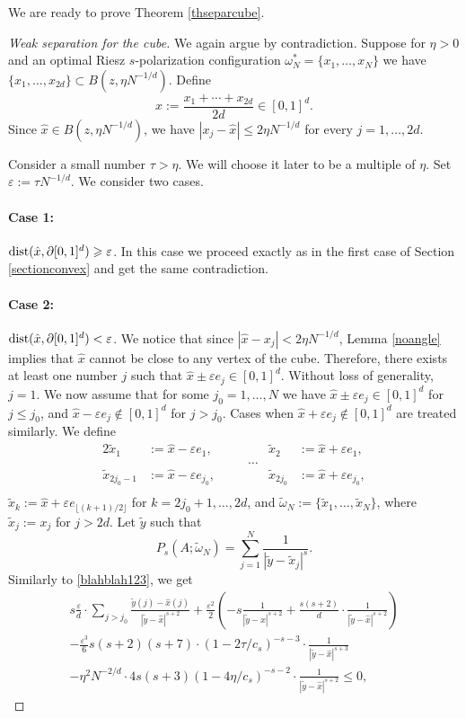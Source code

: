 \documentclass[12pt]{amsart}
\theoremstyle{definition}
\def\sli{\sum\limits}
\def\ep{\varepsilon}
\newcommand{\1}{\mathbf{1}}
\begin{document}
We are ready to prove Theorem \ref{thseparcube}.
\begin{proof}[Weak separation for the cube]
We again argue by contradiction. Suppose for $\eta>0$ and an optimal Riesz $s$-polarization configuration $\omega^*_N=\{x_1, \ldots, x_N\}$ we have $\{x_1, \ldots, x_{2d}\}\subset B(z, \eta N^{-1/d})$. Define
$$
\hat{x}:=\frac{x_1+\cdots+x_{2d}}{2d}\in [0,1]^d.
$$
Since $\hat{x}\in B(z, \eta N^{-1/d})$, we have $|x_j-\hat{x}|\leqslant 2\eta N^{-1/d}$ for every $j=1,\ldots, 2d$. 

Consider a small number $\tau>\eta$. We will choose it later to be a multiple of $\eta$. Set $\ep:=\tau N^{-1/d}$. We consider two cases.
\paragraph{\textbf{Case 1:}} $\textup{dist}(\hat{x}, \partial [0,1]^d)\geqslant \ep$.
In this case we proceed exactly as in the first case of Section \ref{sectionconvex} and get the same contradiction.

\bigskip

\paragraph{\textbf{Case 2:}}$\textup{dist}(\hat{x}, \partial [0,1]^d)<\ep$. We notice that since $|\hat{x}-x_j|<2\eta N^{-1/d}$, Lemma \ref{noangle} implies that $\hat{x}$ cannot be close to any vertex of the cube. Therefore, there exists at least one number $j$ such that $\hat{x}\pm \ep e_j \in [0,1]^d$. Without loss of generality, $j=1$. We now assume that for some $j_0=1,\ldots, N$ we have $\hat{x}\pm \ep e_j \in [0,1]^d$ for $j\leqslant j_0$, and $\hat{x}-\ep e_j \not\in [0,1]^d$ for $j>j_0$. Cases when $\hat{x}+\ep e_j\not\in [0,1]^d$ are treated similarly.
We define
\begin{alignat*}{2}
\tilde{x}_1&:=\hat{x}-\ep e_1,  & \tilde{x}_2&:=\hat{x}+\ep e_1,\\
& \qquad\qquad\qquad\qquad\ldots & \\ 
\tilde{x}_{2j_0-1}&:=\hat{x}-\ep e_{j_0}, & \tilde{x}_{2j_0}&:=\hat{x}+\ep e_{j_0},\\
\end{alignat*}
$\tilde{x}_{k}:=\hat{x}+\ep e_{\lfloor (k+1)/2 \rfloor}$ for $k=2j_0+1,\ldots, 2d$, and $\widetilde{\omega}_N:=\{\tilde{x}_1, \ldots, \tilde{x}_N\}$, where $\tilde{x}_j:=x_j$ for $j>2d$. Let $\tilde{y}$ such that 
$$
P_s(A; \widetilde\omega_N)=\sli_{j=1}^N\frac{1}{|\tilde{y}-\tilde{x}_j|^s}.
$$
Similarly to \eqref{blahblah123}, we get
\begin{multline}\label{blahblah321}
s\frac{\ep}d \cdot \sli_{j>j_0} \frac{\tilde y(j)-\hat{x}(j)}{|\tilde y - \hat{x}|^{s+2}}+\frac{\ep^2}2 \left(-s\frac{1}{|\tilde{y}-\hat{x}|^{s+2}}+\frac{s(s+2)}{d}\cdot \frac{1}{|\tilde y-\hat{x}|^{s+2}}\right) \\
-\frac{\ep^3}6 s(s+2)(s+7) \cdot (1-2\tau/c_s)^{-s-3}\cdot \frac{1}{|\tilde y-\hat{x}|^{s+3}} \\ 
-\eta^2 N^{-2/d}\cdot 4s (s+3)(1-4\eta/c_s)^{-s-2}\cdot \frac{1}{|\tilde y-\hat{x}|^{s+2}}\leqslant 0,
\end{multline}


\end{proof}
\end{document}
